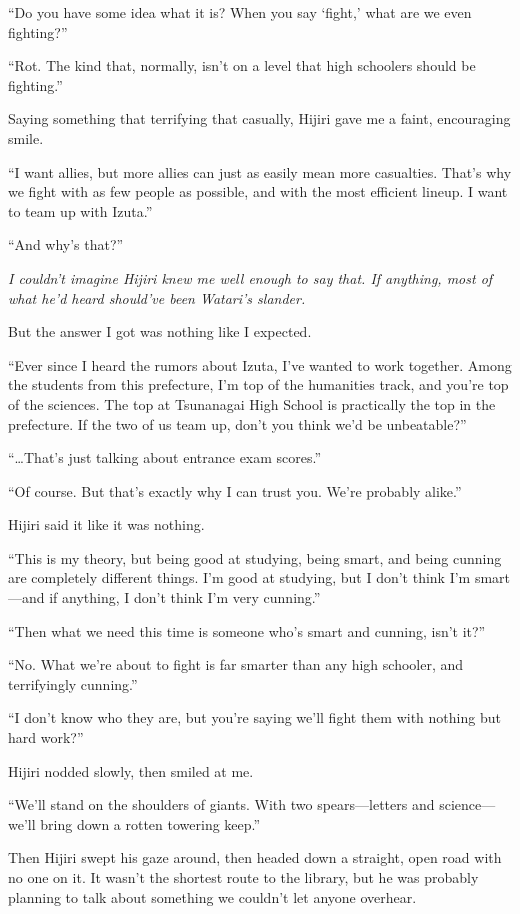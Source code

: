 \documentclass[
    a4paper,
    12pt,
    twoside,
    openany,
    UTF8,
    fontset=windows
]{ctexbook}
\begin{document}
``Do you have some idea what it is? When you say `fight,' what are we even fighting?''

``Rot. The kind that, normally, isn't on a level that high schoolers should be fighting.''

Saying something that terrifying that casually, Hijiri gave me a faint, encouraging smile.

``I want allies, but more allies can just as easily mean more casualties. That's why we fight with as few people as possible, and with the most efficient lineup. I want to team up with Izuta.''

``And why's that?''

\textit{I couldn't imagine Hijiri knew me well enough to say that. If anything, most of what he'd heard should've been Watari's slander.}

But the answer I got was nothing like I expected.

``Ever since I heard the rumors about Izuta, I've wanted to work together. Among the students from this prefecture, I'm top of the humanities track, and you're top of the sciences. The top at Tsunanagai High School is practically the top in the prefecture. If the two of us team up, don't you think we'd be unbeatable?''

``\dots That's just talking about entrance exam scores.''

``Of course. But that's exactly why I can trust you. We're probably alike.''

Hijiri said it like it was nothing.

``This is my theory, but being good at studying, being smart, and being cunning are completely different things. I'm good at studying, but I don't think I'm smart---and if anything, I don't think I'm very cunning.''

``Then what we need this time is someone who's smart and cunning, isn't it?''

``No. What we're about to fight is far smarter than any high schooler, and terrifyingly cunning.''

``I don't know who they are, but you're saying we'll fight them with nothing but hard work?''

Hijiri nodded slowly, then smiled at me.

``We'll stand on the shoulders of giants. With two spears---letters and science---we'll bring down a rotten towering keep.''

Then Hijiri swept his gaze around, then headed down a straight, open road with no one on it. It wasn't the shortest route to the library, but he was probably planning to talk about something we couldn't let anyone overhear.
\end{document}
